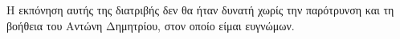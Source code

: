 Η εκπόνηση αυτής της διατριβής δεν θα ήταν δυνατή χωρίς την παρότρυνση και τη
βοήθεια του Αντώνη Δημητρίου, στον οποίο είμαι ευγνώμων.

